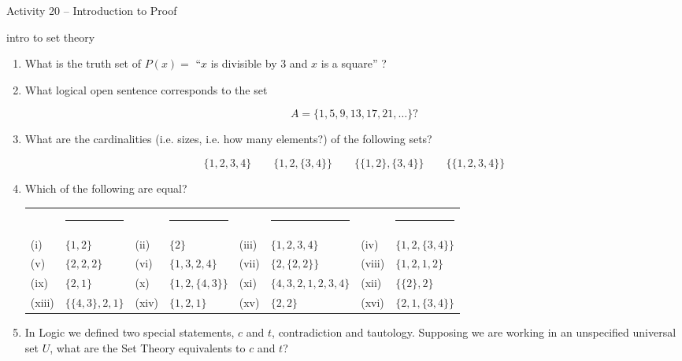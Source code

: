 \documentclass{amsart}
\begin{document}
\thispagestyle{empty}

\centerline{\Large Activity 20 -- Introduction to Proof}
\centerline{\large intro to set theory}

\bigskip
\Large


\begin{enumerate}

\item What is the truth set of $P(x) = $ ``$x$ is divisible by $3$ and $x$ is a square'' ?

\vfill

\item What logical open sentence corresponds to the set 

\[ A = \{ 1, 5, 9, 13, 17, 21, \ldots \} ? \]

\vfill

\item What are the cardinalities (i.e. sizes, i.e. how many elements?) of the following sets?

\[  \{1,2,3,4\} \qquad \{1,2,\{3,4\}\} \qquad \{\{1,2\},\{3,4\}\} \qquad \{\{1,2,3,4\}\}  \]

\vfill

\newpage

\item Which of the following are equal?

\hspace{-1.25in}\begin{tabular}{llllllll}
 & \rule{1.1in}{0pt} &  & \rule{1.1in}{0pt} &  & \rule{1.1in}{0pt} & & \rule{1.1in}{0pt} \\
\rule[-6pt]{0pt}{24pt} (i) & $\{1,2\}$ & (ii) & $\{2\}$ & (iii) & $\{1,2,3,4\}$ & (iv) & $\{1,2,\{3,4\}\}$ \\
\rule[-6pt]{0pt}{24pt} (v) & $\{2,2,2\}$ & (vi) & $\{1,3,2,4\}$ & (vii) & $\{2,\{2,2\}\}$ & (viii) & $\{1,2,1,2\}$\\
\rule[-6pt]{0pt}{24pt} (ix) & $\{2,1\}$ & (x) & $\{1,2,\{4,3\}\}$ & (xi) & $\{4,3,2,1,2,3,4\}$ & (xii) & $\{\{2\},2\}$ \\
\rule[-6pt]{0pt}{24pt} (xiii) & $\{\{4,3\},2,1\}$ & (xiv) & $\{1,2,1\}$ & (xv) & $\{2,2\}$ & (xvi) & $\{2,1,\{3,4\}\}$\\
\end{tabular}

\vfill



\item In Logic we defined two special statements, $c$ and $t$, contradiction and tautology.  Supposing we are working in an unspecified universal set $U$, what are the Set Theory equivalents to $c$ and $t$?


\end{enumerate}
\end{document}
